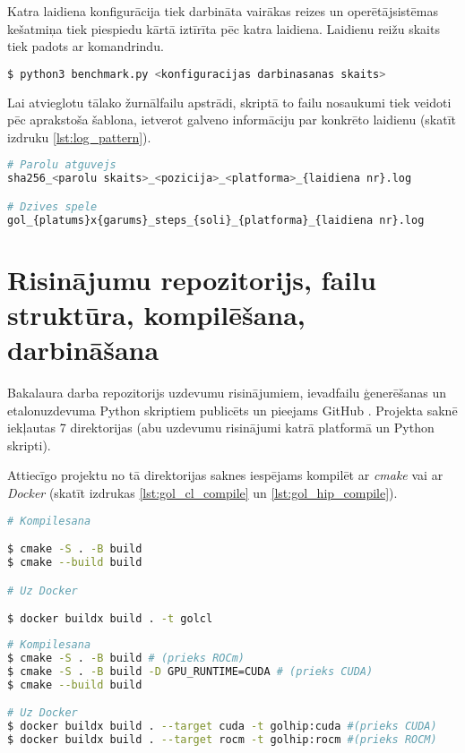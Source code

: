 Katra laidiena konfigurācija tiek darbināta vairākas reizes un operētājsistēmas
kešatmiņa tiek piespiedu kārtā iztīrīta pēc katra laidiena. Laidienu reižu
skaits tiek padots ar komandrindu.

\begin{lstlisting}[caption={Etalonuzdevumu darbināšanas Python skripta darbināšana},
    captionpos=b,
    label=lst:bench_cli, language=bash]
$ python3 benchmark.py <konfiguracijas darbinasanas skaits>
\end{lstlisting}

Lai atvieglotu tālako žurnālfailu apstrādi, skriptā to failu nosaukumi tiek
veidoti pēc aprakstoša šablona, ietverot galveno informāciju par konkrēto
laidienu (skatīt izdruku \ref{lst:log_pattern}).
\begin{lstlisting}[caption={Žurnālfailu nosaukumu šabloni},
    captionpos=b,
    label=lst:log_pattern, language=bash]
# Parolu atguvejs
sha256_<parolu skaits>_<pozicija>_<platforma>_{laidiena nr}.log

# Dzives spele
gol_{platums}x{garums}_steps_{soli}_{platforma}_{laidiena nr}.log
\end{lstlisting}




\section{Risinājumu repozitorijs, failu struktūra, kompilēšana, darbināšana}
Bakalaura darba repozitorijs uzdevumu risinājumiem, ievadfailu ģenerēšanas un
etalonuzdevuma Python skriptiem publicēts un pieejams
GitHub \cite{bak_github_repo}. Projekta saknē iekļautas 7 direktorijas (abu
uzdevumu risinājumi katrā platformā un Python skripti).

Attiecīgo projektu no tā direktorijas saknes iespējams kompilēt ar \textit{cmake}
vai ar \textit{Docker} (skatīt izdrukas \ref{lst:gol_cl_compile} un \ref{lst:gol_hip_compile}).

\begin{lstlisting}[caption={OpenCL un CUDA risinājumu kompilēšana},
    captionpos=b,
    label=lst:gol_cl_compile, language=bash]
# Kompilesana

$ cmake -S . -B build
$ cmake --build build

# Uz Docker

$ docker buildx build . -t golcl
\end{lstlisting}

\begin{lstlisting}[caption={ROCm HIP risinājumu kompilēšana},
    captionpos=b,
    label=lst:gol_hip_compile, language=bash]
# Kompilesana 
$ cmake -S . -B build # (prieks ROCm)
$ cmake -S . -B build -D GPU_RUNTIME=CUDA # (prieks CUDA)
$ cmake --build build

# Uz Docker
$ docker buildx build . --target cuda -t golhip:cuda #(prieks CUDA)
$ docker buildx build . --target rocm -t golhip:rocm #(prieks ROCM)
\end{lstlisting}


